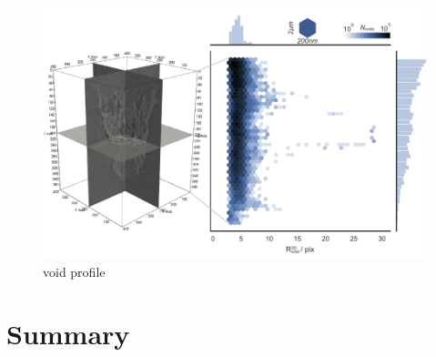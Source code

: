 \documentclass[12pt]{scrartcl}
\newcommand{\myscale}{1}
\begin{document}
\renewcommand{\myscale}{1.0}
\begin{figure}
\centering
\includegraphics[scale=\myscale]{void_profile}
\caption{
void profile
}\label{fig: void profile}
\end{figure}


\section{Summary}\label{sec: summary}




\end{document}
